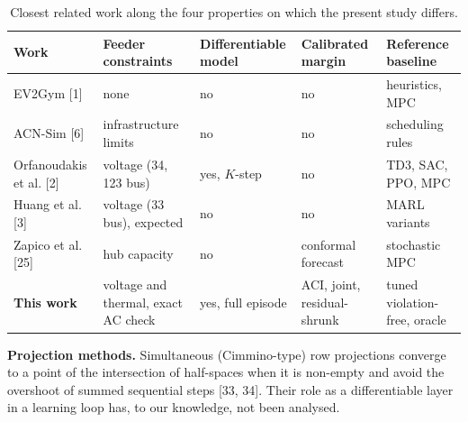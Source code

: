 \documentclass[11pt]{article}
\begin{document}
\begin{table}[h]\centering\footnotesize\setlength{\tabcolsep}{3pt}
\begin{tabular}{@{}L{3.0cm}L{2.6cm}L{2.7cm}L{2.6cm}L{3.0cm}@{}}\toprule
Work & Feeder constraints & Differentiable model & Calibrated margin & Reference baseline\\\midrule
EV2Gym [1] & none & no & no & heuristics, MPC\\
ACN-Sim [6] & infrastructure limits & no & no & scheduling rules\\
Orfanoudakis et al. [2] & voltage (34, 123 bus) & yes, $K$-step & no & TD3, SAC, PPO, MPC\\
Huang et al. [3] & voltage (33 bus), expected & no & no & MARL variants\\
Zapico et al. [25] & hub capacity & no & conformal forecast & stochastic MPC\\
\textbf{This work} & voltage and thermal, exact AC check & yes, full episode & ACI, joint, residual-shrunk & tuned violation-free, oracle\\\bottomrule
\end{tabular}\caption{Closest related work along the four properties on which the present study differs.}\label{tab:rel}\end{table}

\textbf{Projection methods.} Simultaneous (Cimmino-type) row projections converge to a point of the intersection of half-spaces when it is non-empty and avoid the overshoot of summed sequential steps [33, 34]. Their role as a differentiable layer in a learning loop has, to our knowledge, not been analysed.

\end{document}
